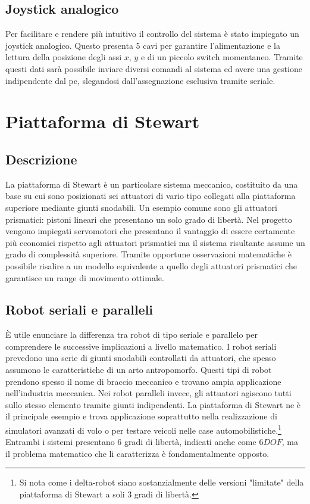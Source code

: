 \documentclass[11pt]{article}
\begin{document}
\subsection{Joystick analogico}\label{joystick}
Per facilitare e rendere più intuitivo il controllo del sistema è stato impiegato un joystick analogico. Questo presenta 5 cavi per garantire l'alimentazione e la lettura della posizione degli assi $x$, $y$ e di un piccolo switch momentaneo. Tramite questi dati sarà possibile inviare diversi comandi al sistema ed avere una gestione indipendente dal pc, slegandosi dall'assegnazione esclusiva tramite seriale.

\newpage

\section{Piattaforma di Stewart}\label{pianostewart}



\subsection{Descrizione}\label{piattaformastewart}
La piattaforma di Stewart è un particolare sistema meccanico, costituito da una base su cui sono posizionati sei attuatori di vario tipo collegati alla piattaforma superiore mediante giunti snodabili. Un esempio comune sono gli attuatori prismatici: pistoni lineari che presentano un solo grado di libertà. Nel progetto vengono impiegati servomotori che presentano il vantaggio di essere certamente più economici rispetto agli attuatori prismatici ma il sistema risultante assume un grado di complessità superiore. Tramite opportune osservazioni matematiche è possibile risalire a un modello equivalente a quello degli attuatori prismatici che garantisce un range di movimento ottimale.

\subsection{Robot seriali e paralleli}\label{robotserialiparalleli}
È utile enunciare la differenza tra robot di tipo seriale e parallelo per comprendere le successive implicazioni a livello matematico.
I robot seriali prevedono una serie di giunti snodabili controllati da attuatori, che spesso assumono le caratteristiche di un arto antropomorfo. 
Questi tipi di robot prendono spesso il nome di braccio meccanico e trovano ampia applicazione nell'industria meccanica.
Nei robot paralleli invece, gli attuatori agiscono tutti sullo stesso elemento tramite giunti indipendenti. 
La piattaforma di Stewart ne è il principale esempio e trova applicazione soprattutto nella realizzazione di simulatori avanzati di volo o per testare veicoli nelle case automobilistiche.\footnote{Si nota come i delta-robot siano sostanzialmente delle versioni "limitate" della piattaforma di Stewart a soli 3 gradi di libertà.}
Entrambi i sistemi presentano 6 gradi di libertà, indicati anche come $6DOF$, ma il problema matematico che li caratterizza è fondamentalmente opposto.
\end{document}
